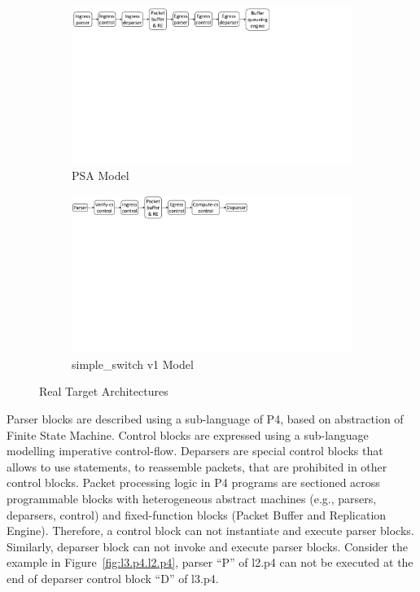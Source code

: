 \documentclass[10pt,sigconf,letterpaper,anonymous]{acmart}
\begin{document}
\begin{figure}
    \begin{subfigure}{\linewidth}
        \centering
        \includegraphics[trim=7 450 281 0, clip,scale=0.36]{psa-pipeline.pdf}
        \caption{PSA Model}
        \label{subfig:psa-model}
    \end{subfigure}
    \begin{subfigure}[b]{\linewidth}
        \centering
        \includegraphics[trim=3 460 357 0, clip,scale=0.35]{v1model-pipeline.pdf}
        \caption{simple\_switch v1 Model}
        \label{subfig:v1model}
    \end{subfigure}
\caption{Real Target Architectures}
\label{fig:real-target-architectures}
\end{figure}


Parser blocks are described using a sub-language of P4, based on abstraction of Finite State Machine.
Control blocks are expressed using a sub-language modelling imperative control-flow.
Deparsers are special control blocks that allows to use statements, to reassemble packets, that are prohibited in other control blocks.
Packet processing logic in P4 programs are sectioned across programmable blocks with heterogeneous abstract machines (e.g., parsers, deparsers, control) and fixed-function blocks (Packet Buffer and Replication Engine).
Therefore, a control block can not instantiate and execute parser blocks. Similarly, deparser block can not invoke and execute parser blocks.  
Consider the example in Figure~\ref{fig:l3.p4.l2.p4}, parser ``P'' of l2.p4 can not be executed at the end of deparser control block ``D'' of l3.p4.
\end{document}

